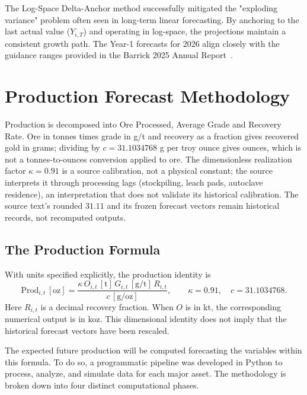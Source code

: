 The Log-Space Delta-Anchor method successfully mitigated the "exploding variance" problem often seen in long-term linear forecasting. By anchoring to the last actual value ($Y_{i,T}$) and operating in log-space, the projections maintain a consistent growth path. The Year-1 forecasts for 2026 align closely with the guidance ranges provided in the Barrick 2025 Annual Report~\cite{barrick-ar-2025}.


\section{Production Forecast Methodology}

Production is decomposed into Ore Processed, Average Grade and Recovery Rate.
Ore in tonnes times grade in g/t and recovery as a fraction gives recovered
gold in grams; dividing by $c=31.1034768$ g per troy ounce gives ounces, which
is not a tonnes-to-ounces conversion applied to ore. The dimensionless
realization factor $\kappa=0.91$ is a source calibration, not a physical
constant; the source interprets it through processing lags (stockpiling, leach
pads, autoclave residence), an interpretation that does not validate its
historical calibration. The source text's rounded $31.11$ and its frozen
forecast vectors remain historical records, not recomputed outputs.
\subsection{The Production Formula}
With units specified explicitly, the production identity is
\begin{equation}\label{eq:production}
\mathrm{Prod}_{i,t}\,[\mathrm{oz}]
=\frac{\kappa\,O_{i,t}\,[\mathrm t]\,
G_{i,t}\,[\mathrm{g/t}]\,R_{i,t}}{c\,[\mathrm{g/oz}]},
\qquad \kappa=0.91,\quad c=31.1034768.
\end{equation}
Here $R_{i,t}$ is a decimal recovery fraction. When $O$ is in kt,
the corresponding numerical output is in koz. This dimensional
identity does not imply that the historical forecast vectors have
been rescaled.

The expected future production will be computed forecasting the variables within this formula. To do so, a programmatic pipeline was developed in Python to process, analyze, and simulate data for each major asset. The methodology is broken down into four distinct computational phases.

